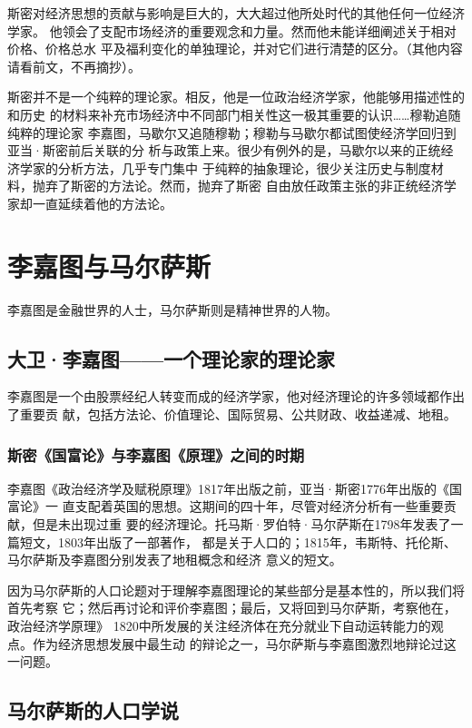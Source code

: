  斯密对经济思想的贡献与影响是巨大的，大大超过他所处时代的其他任何一位经济学家。
 他领会了支配市场经济的重要观念和力量。然而他未能详细阐述关于相对价格、价格总水
 平及福利变化的单独理论，并对它们进行清楚的区分。（其他内容请看前文，不再摘抄）。

 斯密并不是一个纯粹的理论家。相反，他是一位政治经济学家，他能够用描述性的和历史
 的材料来补充市场经济中不同部门相关性这一极其重要的认识……穆勒追随纯粹的理论家
 李嘉图，马歇尔又追随穆勒；穆勒与马歇尔都试图使经济学回归到亚当·斯密前后关联的分
 析与政策上来。很少有例外的是，马歇尔以来的正统经济学家的分析方法，几乎专门集中
 于纯粹的抽象理论，很少关注历史与制度材料，抛弃了斯密的方法论。然而，抛弃了斯密
 自由放任政策主张的非正统经济学家却一直延续着他的方法论。

 \chapter{李嘉图与马尔萨斯}

 李嘉图是金融世界的人士，马尔萨斯则是精神世界的人物。

 \section{大卫·李嘉图——一个理论家的理论家}

李嘉图是一个由股票经纪人转变而成的经济学家，他对经济理论的许多领域都作出了重要贡
献，包括方法论、价值理论、国际贸易、公共财政、收益递减、地租。

\subsection{斯密《国富论》与李嘉图《原理》之间的时期}

李嘉图《政治经济学及赋税原理》1817年出版之前，亚当·斯密1776年出版的《国富论》一
直支配着英国的思想。这期间的四十年，尽管对经济分析有一些重要贡献，但是未出现过重
要的经济理论。托马斯·罗伯特·马尔萨斯在1798年发表了一篇短文，1803年出版了一部著作，
都是关于人口的；1815年，韦斯特、托伦斯、马尔萨斯及李嘉图分别发表了地租概念和经济
意义的短文。

因为马尔萨斯的人口论题对于理解李嘉图理论的某些部分是基本性的，所以我们将首先考察
它；然后再讨论和评价李嘉图；最后，又将回到马尔萨斯，考察他在，政治经济学原理》
1820中所发展的关注经济体在充分就业下自动运转能力的观点。作为经济思想发展中最生动
的辩论之一，马尔萨斯与李嘉图激烈地辩论过这一问题。

\section{马尔萨斯的人口学说}

